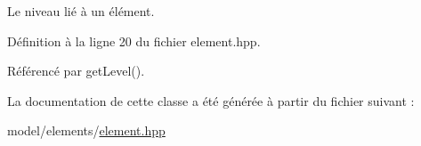 Le niveau lié à un élément. 



Définition à la ligne 20 du fichier element.\+hpp.



Référencé par get\+Level().



La documentation de cette classe a été générée à partir du fichier suivant \+:\begin{DoxyCompactItemize}
\item 
model/elements/\hyperlink{element_8hpp}{element.\+hpp}\end{DoxyCompactItemize}
